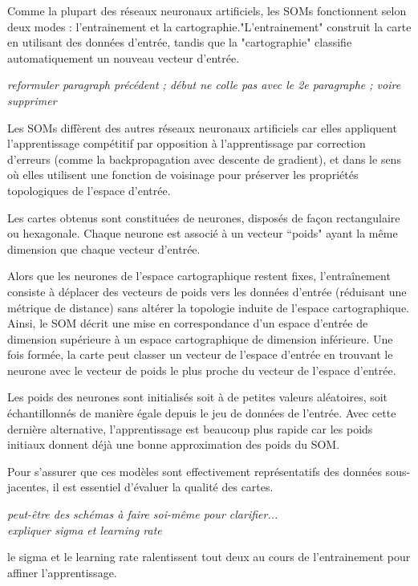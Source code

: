 \documentclass[12pt]{article}
\numberwithin{equation}{section} %
\begin{document}
Comme la plupart des réseaux neuronaux artificiels, les SOMs fonctionnent selon deux modes : l'entrainement et la cartographie."L'entrainement" construit la carte en utilisant des données d'entrée, tandis que la "cartographie" classifie automatiquement un nouveau vecteur d'entrée.

\textit{ reformuler paragraph précédent ; début ne colle pas avec le 2e paragraphe ; voire supprimer}
\vspace{1cm}


Les SOMs diffèrent des autres réseaux neuronaux artificiels car elles appliquent l'apprentissage compétitif par opposition à l'apprentissage par correction d'erreurs (comme la backpropagation avec descente de gradient), et dans le sens où elles utilisent une fonction de voisinage pour préserver les propriétés topologiques de l'espace d'entrée.


Les cartes obtenus sont constituées de neurones, disposés de façon rectangulaire ou hexagonale. Chaque neurone est associé à un vecteur “poids" ayant la même dimension que chaque vecteur d'entrée.


Alors que les neurones de l'espace cartographique restent fixes, l'entraînement consiste à déplacer des vecteurs de poids vers les données d'entrée (réduisant une métrique de distance) sans altérer la topologie induite de l'espace cartographique.  Ainsi, le SOM décrit une mise en correspondance d'un espace d'entrée de dimension supérieure à un espace cartographique de dimension inférieure. Une fois formée, la carte peut classer un vecteur de l'espace d'entrée en trouvant le neurone avec le vecteur de poids le plus proche du vecteur de l'espace d'entrée.


Les poids des neurones sont initialisés soit à de petites valeurs aléatoires, soit échantillonnés de manière égale depuis le jeu de données de l'entrée. Avec cette dernière alternative, l'apprentissage est beaucoup plus rapide car les poids initiaux donnent déjà une bonne approximation des poids du SOM.


 Pour s'assurer que ces modèles sont effectivement représentatifs des données sous-jacentes, il est essentiel d'évaluer la qualité des cartes.

\vspace{2cm}
\textit{peut-être des schémas à faire soi-même pour clarifier... 
\\ expliquer sigma et learning rate}


le sigma et le learning rate ralentissent tout deux au cours de l'entrainement pour affiner l'apprentissage. 
\end{document}
